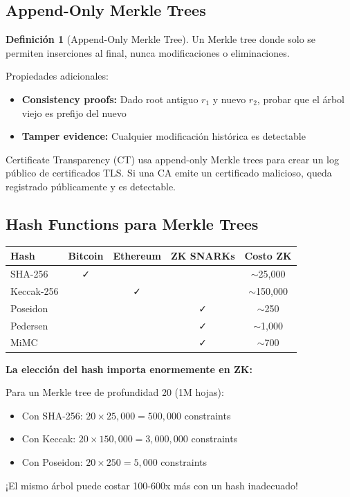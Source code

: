 \documentclass[11pt,a4paper,twoside,openright]{book}
\theoremstyle{definition}
\newtheorem{definition}{Definición}[chapter]
\theoremstyle{plain}
\theoremstyle{remark}
\begin{document}
\subsection{Append-Only Merkle Trees}

\begin{definition}[Append-Only Merkle Tree]
Un Merkle tree donde solo se permiten inserciones al final, nunca modificaciones o eliminaciones.

Propiedades adicionales:
\begin{itemize}
    \item \textbf{Consistency proofs:} Dado root antiguo $r_1$ y nuevo $r_2$, probar que el árbol viejo es prefijo del nuevo
    \item \textbf{Tamper evidence:} Cualquier modificación histórica es detectable
\end{itemize}
\end{definition}

\begin{intuicion}
Certificate Transparency (CT) usa append-only Merkle trees para crear un log público de certificados TLS. Si una CA emite un certificado malicioso, queda registrado públicamente y es detectable.
\end{intuicion}

\subsection{Hash Functions para Merkle Trees}

\begin{center}
\begin{tabular}{lcccc}
\toprule
\textbf{Hash} & \textbf{Bitcoin} & \textbf{Ethereum} & \textbf{ZK SNARKs} & \textbf{Costo ZK} \\
\midrule
SHA-256 & ✓ & & & $\sim$25,000 \\
Keccak-256 & & ✓ & & $\sim$150,000 \\
Poseidon & & & ✓ & $\sim$250 \\
Pedersen & & & ✓ & $\sim$1,000 \\
MiMC & & & ✓ & $\sim$700 \\
\bottomrule
\end{tabular}
\end{center}

\begin{keyidea}
\textbf{La elección del hash importa enormemente en ZK:}

Para un Merkle tree de profundidad 20 (1M hojas):
\begin{itemize}
    \item Con SHA-256: $20 \times 25,000 = 500,000$ constraints
    \item Con Keccak: $20 \times 150,000 = 3,000,000$ constraints
    \item Con Poseidon: $20 \times 250 = 5,000$ constraints
\end{itemize}

¡El mismo árbol puede costar 100-600x más con un hash inadecuado!
\end{keyidea}
\end{document}

